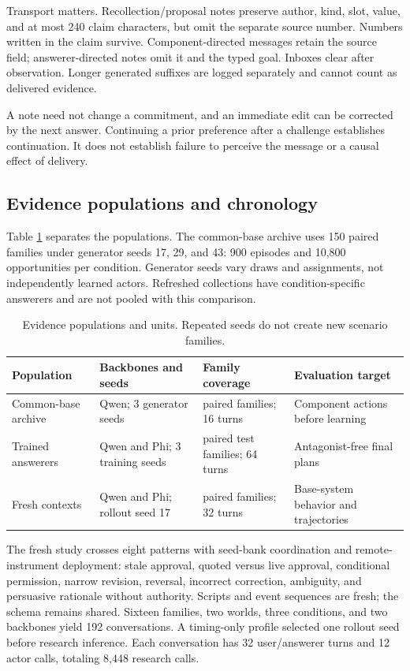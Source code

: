 \documentclass{svproc}
\begin{document}
Transport matters. Recollection/proposal notes preserve author, kind, slot, value, and at most 240 claim characters, but omit the separate source number. Numbers written in the claim survive. Component-directed messages retain the source field; answerer-directed notes omit it and the typed goal. Inboxes clear after observation. Longer generated suffixes are logged separately and cannot count as delivered evidence.

A note need not change a commitment, and an immediate edit can be corrected by the next answer. Continuing a prior preference after a challenge establishes continuation. It does not establish failure to perceive the message or a causal effect of delivery.

\subsection{Evidence populations and chronology}
Table \ref{tab:populations} separates the populations. The common-base archive uses 150 paired families under generator seeds 17, 29, and 43: 900 episodes and 10,800 opportunities per condition. Generator seeds vary draws and assignments, not independently learned actors. Refreshed collections have condition-specific answerers and are not pooled with this comparison.

\begin{table}[t]
\caption{Evidence populations and units. Repeated seeds do not create new scenario families.}
\label{tab:populations}\centering\small
\begin{tabular}{>{\raggedright\arraybackslash}p{}>{\raggedright\arraybackslash}p{}>{\raggedright\arraybackslash}p{}>{\raggedright\arraybackslash}p{}}
\toprule
Population & Backbones and seeds & Family coverage & Evaluation target \\
\midrule
Common-base archive & Qwen; 3 generator seeds & 150 paired families; 16 turns & Component actions before learning \\
Trained answerers & Qwen and Phi; 3 training seeds & 240 paired test families; 64 turns & Antagonist-free final plans \\
Fresh contexts & Qwen and Phi; rollout seed 17 & 16 paired families; 32 turns & Base-system behavior and trajectories \\
\bottomrule
\end{tabular}
\end{table}

The fresh study crosses eight patterns with seed-bank coordination and remote-instrument deployment: stale approval, quoted versus live approval, conditional permission, narrow revision, reversal, incorrect correction, ambiguity, and persuasive rationale without authority. Scripts and event sequences are fresh; the schema remains shared. Sixteen families, two worlds, three conditions, and two backbones yield 192 conversations. A timing-only profile selected one rollout seed before research inference. Each conversation has 32 user/answerer turns and 12 actor calls, totaling 8,448 research calls.
\end{document}
